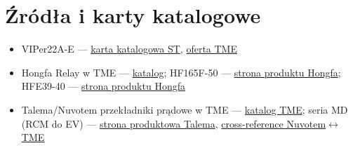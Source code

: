 \documentclass[11pt]{article}
\begin{document}
\section{Źródła i karty katalogowe}
\footnotesize
\begin{itemize}
\item VIPer22A-E — \href{https://www.st.com/resource/en/datasheet/viper22a-e.pdf}{karta katalogowa ST}, \href{https://www.tme.eu/en/details/viper22adip-e/voltage-regulators-pwm-circuits/stmicroelectronics/}{oferta TME}
\item Hongfa Relay w TME — \href{https://www.tme.eu/en/katalog/relays_40/p,hongfa-relay_575/}{katalog}; HF165F-50 — \href{https://www.hongfa.com/product/power-relay/HF165F-50}{strona produktu Hongfa}; HFE39-40 — \href{https://www.hongfa.com/product/latching-relay/HFE39-40}{strona produktu Hongfa}
\item Talema/Nuvotem przekładniki prądowe w TME — \href{https://www.tme.com/us/en-us/katalog/current-transformers_112516/p,talema_346/}{katalog TME}; seria MD (RCM do EV) — \href{https://talema.com/product-tag/sensor/}{strona produktowa Talema}, \href{https://www.nuvotem.com/en/products/part_number_cross_reference_tme.shtml}{cross-reference Nuvotem$\leftrightarrow$TME}
\end{itemize}
\end{document}
